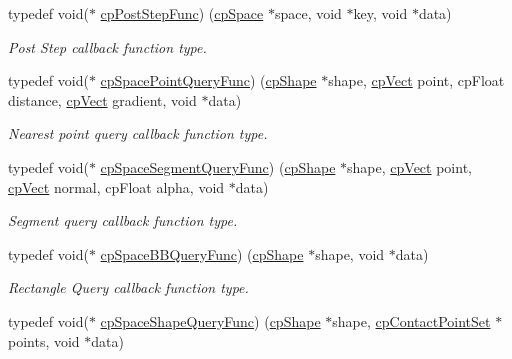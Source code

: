 \begin{DoxyCompactItemize}
typedef void($\ast$ \hyperlink{group__cpSpace_ga93e9005e387fec86eeb4a225ac295a23}{cp\+Post\+Step\+Func}) (\hyperlink{structcpSpace}{cp\+Space} $\ast$space, void $\ast$key, void $\ast$data)
\begin{DoxyCompactList}\small\item\em Post Step callback function type. \end{DoxyCompactList}\item 
\mbox{\label{group__cpSpace_ga646a55f0937f07c19b24561ed5341221}} 
typedef void($\ast$ \hyperlink{group__cpSpace_ga646a55f0937f07c19b24561ed5341221}{cp\+Space\+Point\+Query\+Func}) (\hyperlink{structcpShape}{cp\+Shape} $\ast$shape, \hyperlink{structcpVect}{cp\+Vect} point, cp\+Float distance, \hyperlink{structcpVect}{cp\+Vect} gradient, void $\ast$data)
\begin{DoxyCompactList}\small\item\em Nearest point query callback function type. \end{DoxyCompactList}\item 
\mbox{\label{group__cpSpace_ga9046beaeba5728c5e954f0f1dc2ae130}} 
typedef void($\ast$ \hyperlink{group__cpSpace_ga9046beaeba5728c5e954f0f1dc2ae130}{cp\+Space\+Segment\+Query\+Func}) (\hyperlink{structcpShape}{cp\+Shape} $\ast$shape, \hyperlink{structcpVect}{cp\+Vect} point, \hyperlink{structcpVect}{cp\+Vect} normal, cp\+Float alpha, void $\ast$data)
\begin{DoxyCompactList}\small\item\em Segment query callback function type. \end{DoxyCompactList}\item 
\mbox{\label{group__cpSpace_ga02779238e9b8c07797aae6139fad203c}} 
typedef void($\ast$ \hyperlink{group__cpSpace_ga02779238e9b8c07797aae6139fad203c}{cp\+Space\+B\+B\+Query\+Func}) (\hyperlink{structcpShape}{cp\+Shape} $\ast$shape, void $\ast$data)
\begin{DoxyCompactList}\small\item\em Rectangle Query callback function type. \end{DoxyCompactList}\item 
\mbox{\label{group__cpSpace_gab124952dd71dea36688f6ff6ff8bdcb2}} 
typedef void($\ast$ \hyperlink{group__cpSpace_gab124952dd71dea36688f6ff6ff8bdcb2}{cp\+Space\+Shape\+Query\+Func}) (\hyperlink{structcpShape}{cp\+Shape} $\ast$shape, \hyperlink{structcpContactPointSet}{cp\+Contact\+Point\+Set} $\ast$points, void $\ast$data)

\end{DoxyCompactItemize}
